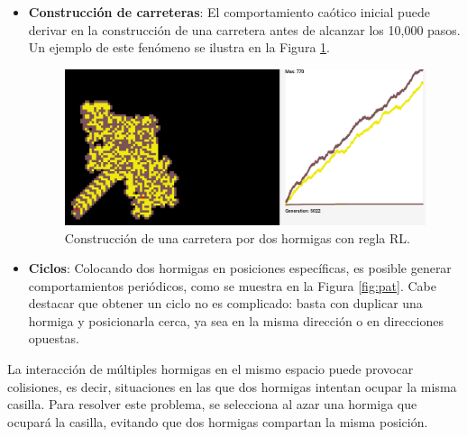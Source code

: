 \documentclass[12pt,twoside]{article}
\begin{document}
\begin{itemize}
	\item \textbf{Construcción de carreteras}: El comportamiento caótico inicial puede derivar en la construcción de una carretera antes de alcanzar los 10,000 pasos. Un ejemplo de este fenómeno se ilustra en la Figura \ref{img:2rl}.  
	
	\begin{figure}[h]
		\centering
		\includegraphics[width=\textwidth]{img/2rl.png}
		\caption{Construcción de una carretera por dos hormigas con regla RL.}
		\label{img:2rl}
	\end{figure}
	
	\item \textbf{Ciclos}: Colocando dos hormigas en posiciones específicas, es posible generar comportamientos periódicos, como se muestra en la Figura \ref{fig:pat}.  
	Cabe destacar que obtener un ciclo no es complicado: basta con duplicar una hormiga y posicionarla cerca, ya sea en la misma dirección o en direcciones opuestas.  
\end{itemize}

	
	La interacción de múltiples hormigas en el mismo espacio puede provocar colisiones, es decir, situaciones en las que dos hormigas intentan ocupar la misma casilla. Para resolver este problema, se selecciona al azar una hormiga que ocupará la casilla, evitando que dos hormigas compartan la misma posición. \\ \\
\end{document}
